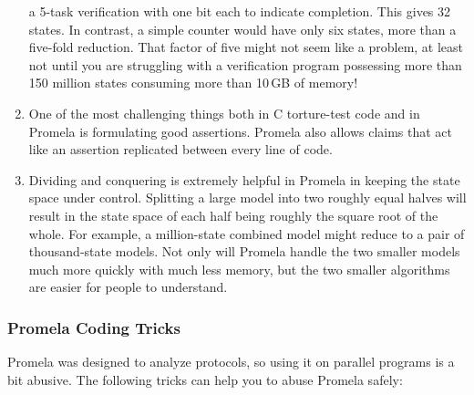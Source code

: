 \begin{enumerate}
	a 5-task verification with one bit each to indicate completion.
	This gives 32 states.  In contrast, a simple counter would have
	only six states, more than a five-fold reduction.  That factor
	of five might not seem like a problem, at least not until you
	are struggling with a verification program possessing more than
	150 million states consuming more than 10\,GB of memory!
\item	One of the most challenging things both in C torture-test code and
	in Promela is formulating good assertions.  Promela also allows
	 claims that act like an assertion replicated
	between every line of code.
\item	Dividing and conquering is extremely helpful in Promela in keeping
	the state space under control.  Splitting a large model into two
	roughly equal halves will result in the state space of each
	half being roughly the square root of the whole.
	For example, a million-state combined model might reduce to a
	pair of thousand-state models.
	Not only will Promela handle the two smaller models much more
	quickly with much less memory, but the two smaller algorithms
	are easier for people to understand.
\end{enumerate}


\subsubsection{Promela Coding Tricks}
\label{sec:formal:Promela Coding Tricks}

Promela was designed to analyze protocols, so using it on parallel programs
is a bit abusive.
The following tricks can help you to abuse Promela safely:


